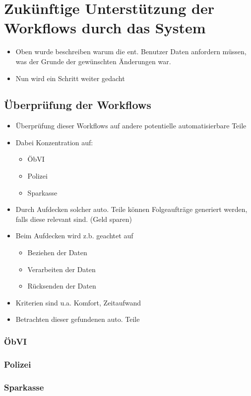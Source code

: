 \chapter{Zukünftige Unterstützung der Workflows durch das System} \label{ch:aussicht}

\begin{itemize}
	\item Oben wurde beschreiben warum die ent. Benutzer Daten anfordern müssen, was der Grunde der gewünschten Änderungen war.
	\item Nun wird ein Schritt weiter gedacht
\end{itemize}

\section{Überprüfung der Workflows}
\begin{itemize}
	\item Überprüfung dieser Workflows auf andere potentielle automatisierbare Teile
	\item Dabei Konzentration auf:
	\begin{itemize}
		\item \ac{ÖbVI}
		\item Polizei
		\item Sparkasse
	\end{itemize}
	\item Durch Aufdecken solcher auto. Teile können Folgeaufträge generiert werden, falls diese relevant sind. (Geld sparen)
	\item Beim Aufdecken wird z.b. geachtet auf
	\begin{itemize}
		\item Beziehen der Daten
		\item Verarbeiten der Daten
		\item Rücksenden der Daten
	\end{itemize}
	\item Kriterien sind u.a. Komfort, Zeitaufwand
	\item Betrachten dieser gefundenen auto. Teile
\end{itemize}
\subsection{\acl{ÖbVI}}
\subsection{Polizei}
\subsection{Sparkasse}

